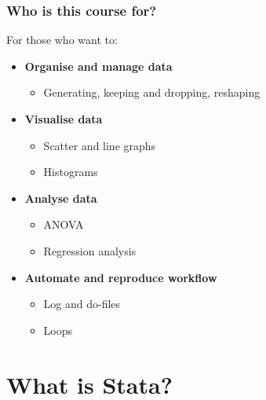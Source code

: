 \documentclass[10pt, compress]{beamer}
\begin{document}
\begin{frame}[fragile]
  \frametitle{Who is this course for?}

    For those who want to:
        \begin{itemize}
            \item \textbf{Organise and manage data}
                \begin{itemize}
                    \item Generating, keeping and dropping, reshaping
                \end{itemize}
            \item \textbf{Visualise data}
                \begin{itemize}
                    \item Scatter and line graphs
                    \item Histograms
                \end{itemize}
            \item \textbf{Analyse data}
                \begin{itemize}
                    \item ANOVA
                    \item Regression analysis
                \end{itemize}
            \item \textbf{Automate and reproduce workflow}
                \begin{itemize}
                    \item Log and do-files
                    \item Loops
                \end{itemize}
        \end{itemize}
      
\end{frame}

\section{What is Stata?}
\end{document}
